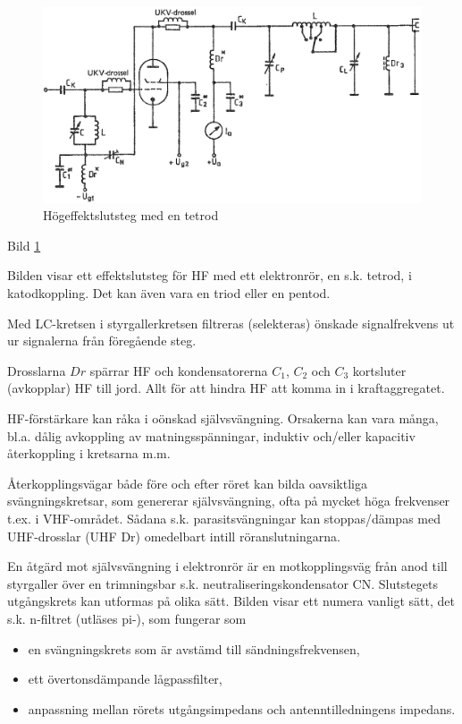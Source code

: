 \begin{figure}
\includegraphics[width=\textwidth]{images/cropped_pdfs/bild_2_3-50.pdf}
\caption{Högeffektslutsteg med en tetrod}
\label{fig:BildII3-50}
\end{figure}

Bild \ref{fig:BildII3-50}

Bilden visar ett effektslutsteg för HF med ett elektronrör, en
s.k. tetrod, i katodkoppling. Det kan även vara en triod eller en
pentod.

Med LC-kretsen i styrgallerkretsen filtreras (selekteras) önskade
signalfrekvens ut ur signalerna från föregående steg.

Drosslarna \(Dr\) spärrar HF och kondensatorerna \(C_1\), \(C_2\) och
\(C_3\) kortsluter (avkopplar) HF till jord. Allt för att hindra HF
att komma in i kraftaggregatet.

HF-förstärkare kan råka i oönskad självsvängning. Orsakerna kan vara
många, bl.a. dålig avkoppling av matningsspänningar, induktiv
och/eller kapacitiv återkoppling i kretsarna m.m.

Återkopplingsvägar både före och efter röret kan bilda oavsiktliga
svängningskretsar, som genererar självsvängning, ofta på mycket höga
frekvenser t.ex. i VHF-området. Sådana s.k. parasitsvängningar kan
stoppas/dämpas med UHF-drosslar (UHF Dr) omedelbart intill
röranslutningarna.

En åtgärd mot självsvängning i elektronrör är en motkopplingsväg från
anod till styrgaller över en trimningsbar
s.k. neutraliseringskondensator CN. Slutstegets utgångskrets kan
utformas på olika sätt. Bilden visar ett numera vanligt sätt, det
s.k. n-filtret (utläses pi-), som fungerar som
\begin{itemize}
\item en svängningskrets som är avstämd till sändningsfrekvensen,
\item ett övertonsdämpande lågpassfilter,
\item anpassning mellan rörets utgångsimpedans och antenntilledningens impedans.
\end{itemize}


